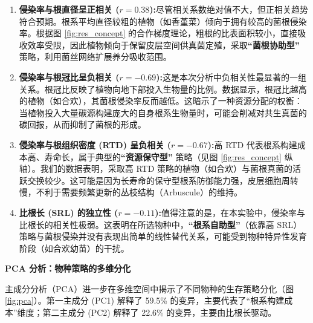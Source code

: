 \documentclass[10.5pt]{config}
\begin{document}
\begin{enumerate}
    \item \textbf{侵染率与根直径呈正相关 ($r = 0.38$):}尽管相关系数绝对值不大，但正相关趋势符合预期。根系平均直径较粗的植物（如香堇菜）倾向于拥有较高的菌根侵染率。根据图 \ref{fig:res_concept} 的合作梯度理论，粗根的比表面积较小，直接吸收效率受限，因此植物倾向于保留皮层空间供真菌定殖，采取\textbf{“菌根协助型” } 策略，利用菌丝网络扩展养分吸收范围。
    
    \item \textbf{侵染率与根冠比呈负相关 ($r = -0.69$):}这是本次分析中负相关性最显著的一组关系。根冠比反映了植物向地下部投入生物量的比例。数据显示，根冠比越高的植物（如合欢），其菌根侵染率反而越低。这暗示了一种资源分配的权衡：当植物投入大量碳源构建庞大的自身根系生物量时，可能会削减对共生真菌的碳回报，从而抑制了菌根的形成。
    
    \item \textbf{侵染率与根组织密度 (RTD) 呈负相关 ($r = -0.67$):}高 RTD 代表根系构建成本高、寿命长，属于典型的\textbf{“资源保守型” } 策略（见图 \ref{fig:res_concept} 纵轴）。我们的数据表明，采取高 RTD 策略的植物（如合欢）与菌根真菌的活跃交换较少。这可能是因为长寿命的保守型根系防御能力强，皮层细胞周转慢，不利于需要频繁更新的丛枝结构（Arbuscule）的维持。
    
    \item \textbf{比根长 (SRL) 的独立性 ($r = -0.11$):}值得注意的是，在本实验中，侵染率与比根长的相关性极弱。这表明在所选物种中，\textbf{“根系自助型”}（依靠高 SRL）策略与菌根侵染并没有表现出简单的线性替代关系，可能受到物种特异性发育阶段（如合欢幼苗）的干扰。
\end{enumerate}

\textbf{PCA 分析：物种策略的多维分化}

主成分分析（PCA）进一步在多维空间中揭示了不同物种的生存策略分化（图 \ref{fig:pca}）。第一主成分 (PC1) 解释了 59.5\% 的变异，主要代表了“根系构建成本”维度；第二主成分 (PC2) 解释了 22.6\% 的变异，主要由比根长驱动。
\end{document}
